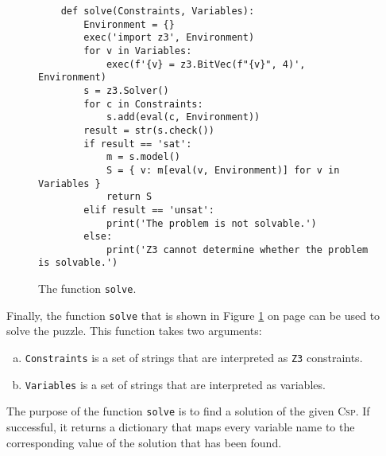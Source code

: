 \begin{figure}[!ht]
\centering
\begin{verbatim}
    def solve(Constraints, Variables):
        Environment = {}
        exec('import z3', Environment)
        for v in Variables:
            exec(f'{v} = z3.BitVec(f"{v}", 4)', Environment)
        s = z3.Solver()
        for c in Constraints:
            s.add(eval(c, Environment))
        result = str(s.check())
        if result == 'sat':
            m = s.model()
            S = { v: m[eval(v, Environment)] for v in Variables }
            return S
        elif result == 'unsat':
            print('The problem is not solvable.')
        else:
            print('Z3 cannot determine whether the problem is solvable.')
\end{verbatim}
\vspace*{-0.3cm}
\caption{The function \texttt{solve}.}
\label{fig:Knight's Tour with Z3.ipynb-2}
\end{figure}
Finally, the function \texttt{solve} that is shown in Figure \ref{fig:Knight's Tour with Z3.ipynb-2} on page
\pageref{fig:Knight's Tour with Z3.ipynb-2} can be used to solve the puzzle.  This function takes two
arguments:
\begin{enumerate}[(a)]
\item \texttt{Constraints} is a set of strings that are interpreted as \texttt{Z3} constraints.
\item \texttt{Variables} is a set of strings that are interpreted as variables.
\end{enumerate}
The purpose of the function \texttt{solve} is to find a solution of the given \textsc{Csp}.
If successful, it returns a dictionary that maps every variable name to the corresponding value of the solution
that has been found.
